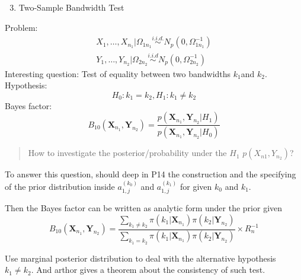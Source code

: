 \documentclass{beamer}
\begin{document}
\begin{frame}

\begin{enumerate}
\setcounter{enumi}{2}
\item
  Two-Sample Bandwidth Test
\end{enumerate}

Problem: \[
\begin{array} { c } { X _ { 1 } , \ldots , X _ { n _ { 1 } } | \Omega _ { 1 n _ { 1 } } \stackrel { i . i . d . } { \sim } N _ { p } \left( 0 , \Omega _ { 1 n _ { 1 } } ^ { - 1 } \right)} \\ { Y _ { 1 } , \ldots , Y _ { n _ { 2 } } | \Omega _ { 2 n _ { 2 } } \stackrel { i . i . d } { \sim } N _ { p } \left( 0 , \Omega _ { 2 n _ { 2 } } ^ { - 1 } \right) } \end{array}
\] Interesting question: Test of equality between two bandwidths
\(k_1\)and \(k_2\). Hypothesis: \[
H _ { 0 } : k _ { 1 } = k _ { 2 },H _ { 1 } : k _ { 1 } \neq k _ { 2 }
\] Bayes factor: \[
B _ { 10 } \left( \mathbf { X } _ { n _ { 1 } } , \mathbf { Y } _ { n _ { 2 } } \right) = \frac { p \left( \mathbf { X } _ { n _ { 1 } } , \mathbf { Y } _ { n _ { 2 } } | H _ { 1 } \right) } { p \left( \mathbf { X } _ { n _ { 1 } } , \mathbf { Y } _ { n _ { 2 } } | H _ { 0 } \right) }
\]

\end{frame}


\begin{frame}

\begin{quote}
How to investigate the posterior/probability under the \(H_1\)
\(p(X_{n1},Y_{n_2})\)?
\end{quote}

To answer this question, should deep in P14 the construction and the
specifying of the prior distribution inside \(a_{1,j}^{(k_0)}\) and
\(a_{1,j}^{(k_1)}\) for given \(k_0\) and \(k_1\).

Then the Bayes factor can be written as analytic form under the prior
given \[
B _ { 10 } \left( \mathbf { X } _ { n _ { 1 } } , \mathbf { Y } _ { n _ { 2 } } \right) = \frac { \sum _ { k _ { 1 } \neq k _ { 2 } } \pi \left( k _ { 1 } | \mathbf { X } _ { n _ { 1 } } \right) \pi \left( k _ { 2 } | \mathbf { Y } _ { n _ { 2 } } \right) } { \sum _ { k _ { 1 } = k _ { 2 } } \pi \left( k _ { 1 } | \mathbf { X } _ { n _ { 1 } } \right) \pi \left( k _ { 2 } | \mathbf { Y } _ { n _ { 2 } } \right) } \times R _ { n } ^ { - 1 }
\]

Use marginal posterior distribution to deal with the alternative
hypothesis \(k_1\neq k_2\). And arthor gives a theorem about the
consistency of such test.

\end{frame}
\end{document}
